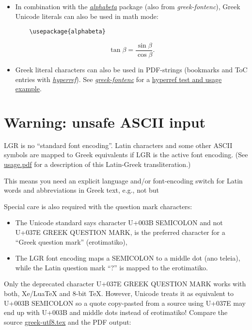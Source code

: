 \documentclass[a4paper]{article}
\providecommand{\ensureascii}[1]{{\fontencoding{T1}\selectfont #1}}
\begin{document}
\begin{itemize}
\item \sloppy
  In combination with the
  \href{http://mirrors.ctan.org/language/greek/greek-fontenc/alphabeta.sty.html}%
  {\emph{alphabeta}} package (also from \emph{greek-fontenc}),
  Greek Unicode literals can also be used in math mode:
  \begin{verbatim}
    \usepackage{alphabeta}
\end{verbatim}
    \[
       \tan β = \frac{\sin β}{\cos β}.
    \]
\fi
\makeatother

\item Greek literal characters can also be used in PDF-strings (bookmarks and
  ToC entries with \href{https://ctan.org/pkg/hyperref}{\emph{hyperref}}).
  See \href{https://ctan.org/pkg/greek-fontenc}{\emph{greek-fontenc}}
  for a
  \href{https://mirrors.ctan.org/language/greek/greek-fontenc/hyperref-with-greek.pdf}
  {hyperref test and usage example}.

\end{itemize}


\section{Warning: unsafe ASCII input}

LGR is no ``standard font encoding''. Latin characters and some other ASCII
symbols are mapped to Greek equivalents if LGR is the active font encoding.
(See
\href{https://mirrors.ctan.org/language/babel/contrib/greek/usage.pdf}%
{usage.pdf} for a description of this Latin-Greek transliteration.)

This means you need an explicit language and/or font-encoding switch for
Latin words and abbreviations in Greek text, e.g., not
 but
\ensuregreek{((ηία αντίσταση 750-\ensureascii{k}Ω))}

Special care is also required with the question mark characters:
\begin{itemize}
  \item The Unicode standard says character U+003B SEMICOLON and not
        U+037E GREEK QUESTION MARK, is the preferred character for a
        ``Greek question mark'' (erotimatiko),
  \item The LGR font encoding maps a SEMICOLON to a middle dot (ano teleia),
        while the Latin question mark ``?'' is mapped to the erotimatiko.
\end{itemize}
Only the deprecated character U+037E GREEK QUESTION MARK works with both,
Xe/LuaTeX and 8-bit TeX. However, Unicode treats it as equivalent
to U+003B SEMICOLON so a quote copy-pasted from a source using U+037E may
end up with U+003B and middle dots instead of erotimatiko!
\makeatletter
\ifdefined\textalpha@define@breathings
  Compare the source \url{greek-utf8.tex} and the PDF output:
\end{document}
